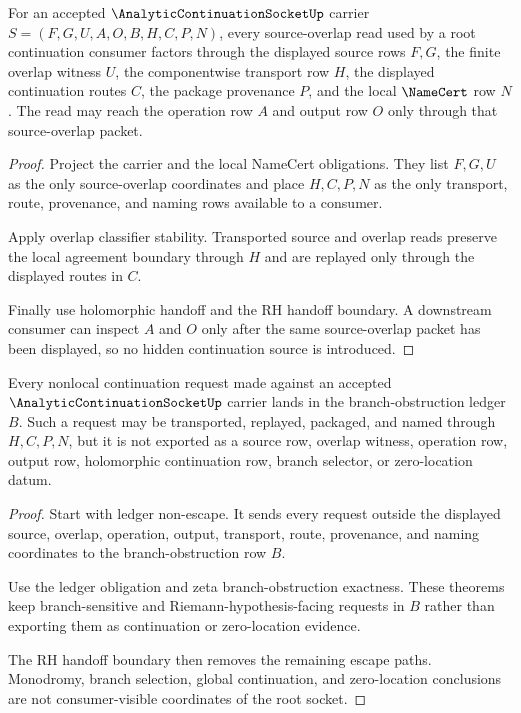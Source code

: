 \begin{theorem}
\label{thm:analytic-continuation-socket-root-source-overlap}
For an accepted $\AnalyticContinuationSocketUp$ carrier
$S=(F,G,U,A,O,B,H,C,P,N)$, every source-overlap read used by a root
continuation consumer factors through the displayed source rows $F,G$, the
finite overlap witness $U$, the componentwise transport row $H$, the displayed
continuation routes $C$, the package provenance $P$, and the local
$\NameCert$ row $N$. The read may reach the operation row $A$ and output row
$O$ only through that source-overlap packet.
\end{theorem}
\begin{proof}
Project the carrier and the local NameCert obligations. They list $F,G,U$ as
the only source-overlap coordinates and place $H,C,P,N$ as the only transport,
route, provenance, and naming rows available to a consumer.

Apply overlap classifier stability. Transported source and overlap reads
preserve the local agreement boundary through $H$ and are replayed only
through the displayed routes in $C$.

Finally use holomorphic handoff and the RH handoff boundary. A downstream
consumer can inspect $A$ and $O$ only after the same source-overlap packet has
been displayed, so no hidden continuation source is introduced.
\end{proof}

\begin{theorem}
\label{thm:analytic-continuation-socket-root-branch-ledger}
Every nonlocal continuation request made against an accepted
$\AnalyticContinuationSocketUp$ carrier lands in the branch-obstruction ledger
$B$. Such a request may be transported, replayed, packaged, and named through
$H,C,P,N$, but it is not exported as a source row, overlap witness, operation
row, output row, holomorphic continuation row, branch selector, or
zero-location datum.
\end{theorem}
\begin{proof}
Start with ledger non-escape. It sends every request outside the displayed
source, overlap, operation, output, transport, route, provenance, and naming
coordinates to the branch-obstruction row $B$.

Use the ledger obligation and zeta branch-obstruction exactness. These
theorems keep branch-sensitive and Riemann-hypothesis-facing requests in
$B$ rather than exporting them as continuation or zero-location evidence.

The RH handoff boundary then removes the remaining escape paths. Monodromy,
branch selection, global continuation, and zero-location conclusions are not
consumer-visible coordinates of the root socket.
\end{proof}

